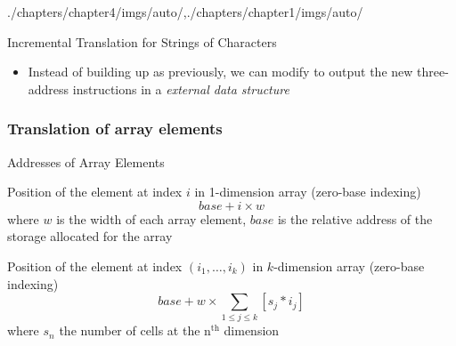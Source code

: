 \begin{graphicspathcontext}{{./chapters/chapter4/imgs/auto/},{./chapters/chapter1/imgs/auto/}}
\begin{bibunit}[apalike]
\begin{frame}{{Incremental Translation} for Strings of Characters}
	\begin{itemize}
	\item Instead of building up  as previously, we can modify  to output the new three-address instructions in a \emph{external data structure}
	\end{itemize}
	\vspace{1cm}
	\begin{footnotesize}
	\begin{sdd}
	\end{sdd}
	\end{footnotesize}
\end{frame}

\subsubsection{Translation of array elements}
\subsubsectiontableofcontentslide

\begin{frame}{Addresses of Array Elements}
	\smaller
	\begin{definitionblock}{Position of the element at index $i$ in 1-dimension array (zero-base indexing)}
		\[ base + i \times w \]
		where $w$ is the width of each array element, $base$ is the relative address of the storage allocated for the array
	\end{definitionblock}
	\begin{definitionblock}{Position of the element at index $(i_1,\dots,i_k)$ in $k$-dimension array (zero-base indexing)}
		\[ base + w \times \sum_{1 \le j \le k} \left[ s_j * i_j \right] \]
		where $s_n$ the number of cells at the n$^{\text{th}}$ dimension
	\end{definitionblock}
\end{frame}


\end{bibunit}
\end{graphicspathcontext}

